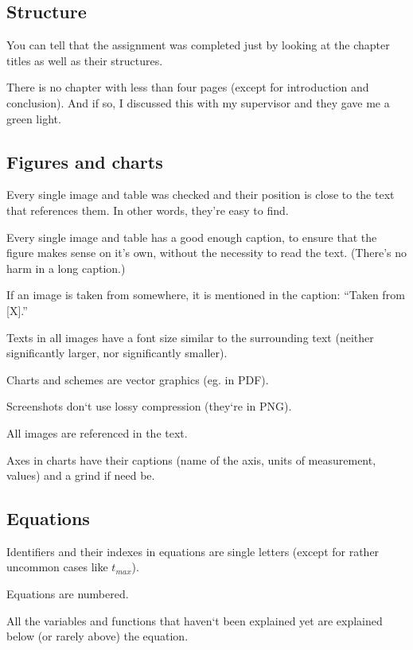 \subsection*{Structure}
\begin{checklist}
	\item You can tell that the assignment was completed just by looking at the chapter titles as well as their structures.
    \item There is no chapter with less than four pages (except for introduction and conclusion). And if so, I discussed this with my supervisor and they gave me a green light.
\end{checklist}

\subsection*{Figures and charts}
\begin{checklist}
	\item Every single image and table was checked and their position is close to the text that references them. In other words, they’re easy to find.
    \item Every single image and table has a good enough caption, to ensure that the figure makes sense on it’s own, without the necessity to read the text. (There’s no harm in a long caption.)
    \item If an image is taken from somewhere, it is mentioned in the caption: “Taken from [X].”
    \item Texts in all images have a font size similar to the surrounding text (neither significantly larger, nor significantly smaller).
    \item Charts and schemes are vector graphics (eg. in PDF).
    \item Screenshots don‘t use lossy compression (they‘re in PNG).
    \item All images are referenced in the text.
    \item Axes in charts have their captions (name of the axis, units of measurement, values) and a grind if need be.
\end{checklist}

\subsection*{Equations}
\begin{checklist}
	\item Identifiers and their indexes in equations are single letters (except for rather uncommon cases like $t_{max}$).
    \item Equations are numbered.
    \item All the variables and functions that haven‘t been explained yet are explained below (or rarely above) the equation.
\end{checklist}

